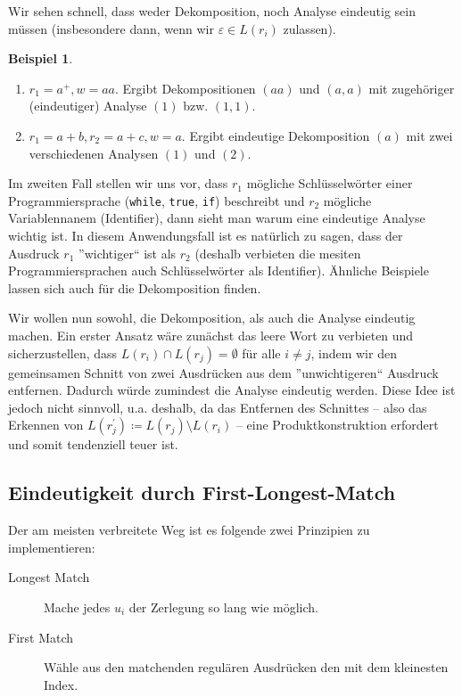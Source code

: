 \documentclass[11pt, a4paper]{article}
\theoremstyle{definition}
\newtheorem{example}[definition]{Beispiel}
\theoremstyle{plain}
\begin{document}
Wir sehen schnell, dass weder Dekomposition, noch Analyse eindeutig sein müssen (insbesondere dann, wenn wir \( \varepsilon \in L(r_i) \) zulassen).
\begin{example}
	\begin{enumerate}
		\item \( r_1 = a^+, w = aa \). Ergibt Dekompositionen \( (aa) \) und \( (a, a) \) mit zugehöriger (eindeutiger) Analyse \( (1) \) bzw. \( (1, 1) \).
		\item \( r_1 = a+b, r_2 = a+c, w = a \). Ergibt eindeutige Dekomposition \( (a) \) mit zwei verschiedenen Analysen \( (1) \) und \( (2) \).	
	\end{enumerate}
	Im zweiten Fall stellen wir uns vor, dass \( r_1 \) mögliche Schlüsselwörter einer Programmiersprache (\texttt{while}, \texttt{true}, \texttt{if}) beschreibt und \( r_2 \) mögliche Variablennanem (Identifier), dann sieht man warum eine eindeutige Analyse wichtig ist. In diesem Anwendungsfall ist es natürlich zu sagen, dass der Ausdruck \( r_1 \) ''wichtiger`` ist als \( r_2 \) (deshalb verbieten die mesiten Programmiersprachen auch Schlüsselwörter als Identifier). Ähnliche Beispiele lassen sich auch für die Dekomposition finden.
\end{example}

Wir wollen nun sowohl, die Dekomposition, als auch die Analyse eindeutig machen. Ein erster Ansatz wäre zunächst das leere Wort zu verbieten und sicherzustellen, dass \( L(r_i) \cap L(r_j) = \emptyset \) für alle \( i \neq j \), indem wir den gemeinsamen Schnitt von zwei Ausdrücken aus dem ''unwichtigeren`` Ausdruck entfernen. Dadurch würde zumindest die Analyse eindeutig werden. Diese Idee ist jedoch nicht sinnvoll, u.a. deshalb, da das Entfernen des Schnittes -- also das Erkennen von \( L(r_j^\prime) \coloneqq L(r_j) \setminus L(r_i) \) -- eine Produktkonstruktion erfordert und somit tendenziell teuer ist.


\subsection*{Eindeutigkeit durch First-Longest-Match}
Der am meisten verbreitete Weg ist es folgende zwei Prinzipien zu implementieren:
\begin{description}
	\item[Longest Match] Mache jedes \( u_i \) der Zerlegung so lang wie möglich.
	\item[First Match] Wähle aus den matchenden regulären Ausdrücken den mit dem kleinesten Index.
\end{description}
\end{document}

